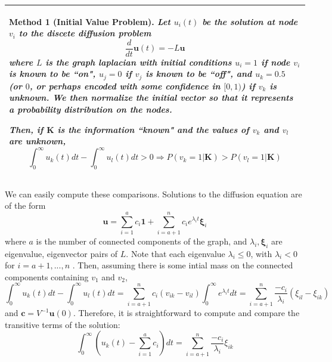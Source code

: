 \documentclass[10pt]{article}
\newtheorem{method}{Method}
\theoremstyle{definition}
\numberwithin{theorem}{section}
\numberwithin{definition}{section}
\numberwithin{lemma}{section}
\numberwithin{corollary}{section}
\numberwithin{clm}{section}
\numberwithin{rmk}{section}
\newenvironment{inbox2}
{\begin{center}
		\begin{tabular}{|p{0.9\textwidth}|}
			\hline \vspace{-0.5 cm}
		}
		{ 
			\\ \hline
		\end{tabular} 
	\end{center}
}
\renewcommand{\b}{\bm}
\begin{document}
\begin{inbox2}
\begin{method}[Initial Value Problem]\label{initalCond}
Let $u_i(t)$ be the solution at node $v_i$ to the discete diffusion problem
\[
\frac{d}{dt}\b{u}(t)  = - L\b{u}
\]
where $L$ is the  graph laplacian with initial conditions $u_i = 1$ if node $v_i$ is known to be ``on", $u_j = 0$ if $v_j$ is known to be ``off", and $u_k = 0.5$ (or $0$, or perhaps encoded with some confidence in $[0,1)$) if $v_k$ is unknown. We then normalize the initial vector so that it represents a probability distribution on the nodes.

Then, if $\b{K}$ is the information ``known" and the values of $v_{k}$ and $v_{l}$ are unknown,
\[
\int_0^{\infty} u_k(t) dt - \int_0^{\infty} u_l(t) dt >  0 \Rightarrow  P(v_k=  1|\b{K}) > P(v_l = 1|\b{K})
\]
\end{method}
\end{inbox2}
We can easily compute these comparisons. Solutions to the diffusion equation are of the form
\[
\b{u} = \sum_{i=1}^a c_i \b{1} + \sum_{i=a+1}^n c_i e^{\lambda_i t} \b{\xi}_i 
\]
where $a$ is the number of connected components of the graph, and $\lambda_i,\b{\xi}_i$ are eigenvalue, eigenvector pairs of $L$. Note that each eigenvalue $\lambda_i \leq 0$, with $\lambda_i<0$ for $i = a+1,...,n$ \cite{vonLuxburg2007}. Then, assuming there is some intial mass on the connected components containing $v_1$ and $v_2$, 
\[
\int_0^{\infty} u_k(t) dt - \int_0^{\infty} u_l(t) dt =   \sum_{i=a+1}^n c_i  (v_{ik} - v_{il}) \int_0^{\infty} e^{\lambda_i t} dt = \sum_{i=a+1}^n \frac{-c_i}{\lambda_i}  (\xi_{il} - \xi_{ik}) 
\]
and $\b{c} = V^{-1}\b{u}(0)$. Therefore, it is straightforward to compute and compare the transitive terms of the solution:
\[
\int_0^{\infty}\left( u_k(t) - \sum_{i=1}^a c_i \right) dt = \sum_{i=a+1}^n \frac{-c_i}{\lambda_i}\xi_{ik}
\]
\end{document}
